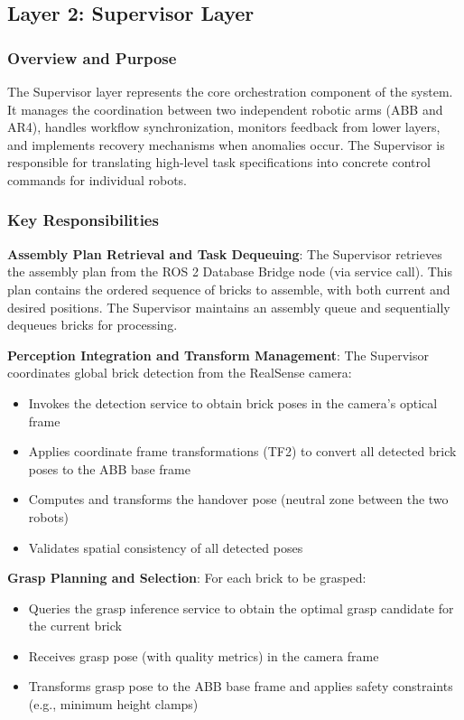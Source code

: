 \subsection{Layer 2: Supervisor Layer}
\label{subsec:supervisor_layer}

\subsubsection{Overview and Purpose}
The Supervisor layer represents the core orchestration component of the system. It manages the coordination between two independent robotic arms (ABB and AR4), handles workflow synchronization, monitors feedback from lower layers, and implements recovery mechanisms when anomalies occur. The Supervisor is responsible for translating high-level task specifications into concrete control commands for individual robots.

\subsubsection{Key Responsibilities}

\textbf{Assembly Plan Retrieval and Task Dequeuing}: The Supervisor retrieves the assembly plan from the ROS 2 Database Bridge node (via service call). This plan contains the ordered sequence of bricks to assemble, with both current and desired positions. The Supervisor maintains an assembly queue and sequentially dequeues bricks for processing.

\textbf{Perception Integration and Transform Management}: The Supervisor coordinates global brick detection from the RealSense camera:
\begin{itemize}
    \item Invokes the detection service to obtain brick poses in the camera's optical frame
    \item Applies coordinate frame transformations (TF2) to convert all detected brick poses to the ABB base frame
    \item Computes and transforms the handover pose (neutral zone between the two robots)
    \item Validates spatial consistency of all detected poses
\end{itemize}

\textbf{Grasp Planning and Selection}: For each brick to be grasped:
\begin{itemize}
    \item Queries the grasp inference service to obtain the optimal grasp candidate for the current brick
    \item Receives grasp pose (with quality metrics) in the camera frame
    \item Transforms grasp pose to the ABB base frame and applies safety constraints (e.g., minimum height clamps)
\end{itemize}

